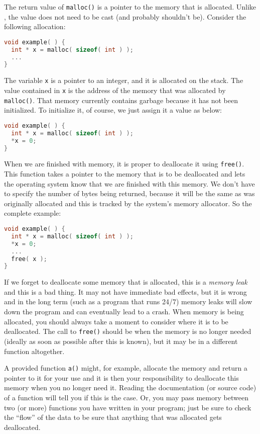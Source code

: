 The return value of \texttt{malloc()} is a pointer to the memory that is allocated. Unlike \Cpp, the value does not need to be cast (and probably shouldn't be).
Consider the following allocation:

\begin{lstlisting}[language=C]
void example( ) {
  int * x = malloc( sizeof( int ) );
  ...
}
\end{lstlisting}

The variable \texttt{x} is a pointer to an integer, and it is allocated on the stack. The value contained in \texttt{x} is the address of the memory that was allocated by \texttt{malloc()}. That memory currently contains garbage because it has not been initialized. To initialize it, of course, we just assign it a value as below:

\begin{lstlisting}[language=C]
void example( ) {
  int * x = malloc( sizeof( int ) );
  *x = 0;
}
\end{lstlisting}

When we are finished with memory, it is proper to deallocate it using \texttt{free()}. This function takes a pointer to the memory that is to be deallocated and lets the operating system know that we are finished with this memory. We don't have to specify the number of bytes being returned, because it will be the same as was originally allocated and this is tracked by the system's memory allocator. So the complete example:

\begin{lstlisting}[language=C]
void example( ) {
  int * x = malloc( sizeof( int ) );
  *x = 0;
  ...
  free( x );
}
\end{lstlisting}

If we forget to deallocate some memory that is allocated, this is a \textit{memory leak} and this is a bad thing. It may not have immediate bad effects, but it is wrong and in the long term (such as a program that runs 24/7) memory leaks will slow down the program and can eventually lead to a crash. When memory is being allocated, you should always take a moment to consider where it is to be deallocated. The call to \texttt{free()} should be when the memory is no longer needed (ideally as soon as possible after this is known), but it may be in a different function altogether.

A provided function \texttt{a()} might, for example, allocate the memory and return a pointer to it for your use and it is then your responsibility to deallocate this memory when you no longer need it. Reading the documentation (or source code) of a function will tell you if this is the case. Or, you may pass memory between two (or more) functions you have written in your program; just be sure to check the ``flow'' of the data to be sure that anything that was allocated gets deallocated.

